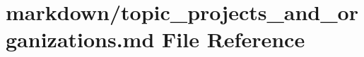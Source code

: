 \hypertarget{topic__projects__and__organizations_8md}{}\section{markdown/topic\+\_\+projects\+\_\+and\+\_\+organizations.md File Reference}
\label{topic__projects__and__organizations_8md}
